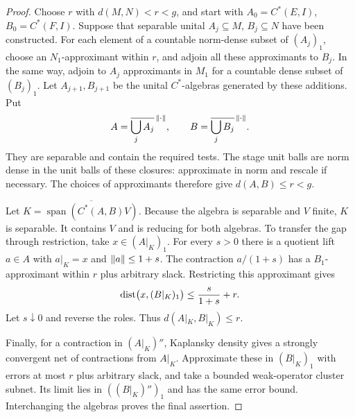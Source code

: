 \begin{proof}
Choose $r$ with $d(M,N)<r<g$, and start with
$A_0=C^*(E,I)$, $B_0=C^*(F,I)$.  Suppose that separable unital
$A_j\subseteq M$, $B_j\subseteq N$ have been constructed.  For
each element of a countable norm-dense subset of $(A_j)_1$, choose
an $N_1$-approximant within $r$, and adjoin all these approximants
to $B_j$.  In the same way, adjoin to $A_j$ approximants in $M_1$
for a countable dense subset of $(B_j)_1$.  Let $A_{j+1},B_{j+1}$
be the unital $C^*$-algebras generated by these additions.  Put
\[
 A=\overline{\bigcup_j A_j}^{\,\lVert\cdot\rVert},
 \qquad B=\overline{\bigcup_j B_j}^{\,\lVert\cdot\rVert}.
\]
They are separable and contain the required tests.  The stage unit
balls are norm dense in the unit balls of these closures: approximate
in norm and rescale if necessary.  The choices of approximants
therefore give $d(A,B)\leq r<g$.

Let $K=\overline{\operatorname{span}(C^*(A,B)V)}$.
Because the algebra is separable and
$V$ finite, $K$ is separable.  It contains $V$ and is reducing for
both algebras.  To transfer the gap through restriction, take
$x\in(A|_K)_1$.  For every $s>0$ there is a quotient lift
$a\in A$ with $a|_K=x$ and $\lVert a\rVert\leq1+s$.  The contraction
$a/(1+s)$ has a $B_1$-approximant within $r$ plus arbitrary slack.
Restricting this approximant gives
\[
 \operatorname{dist}\bigl(x,(B|_K)_1\bigr)
 \leq \frac{s}{1+s}+r.
\]
Let $s\downarrow0$ and reverse the roles.  Thus
$d(A|_K,B|_K)\leq r$.

Finally, for a contraction in $(A|_K)''$, Kaplansky density gives
a strongly convergent net of contractions from $A|_K$.  Approximate
these in $(B|_K)_1$ with errors at most $r$ plus arbitrary slack,
and take a bounded weak-operator cluster subnet.  Its limit lies in
$((B|_K)'')_1$ and has the same error bound.  Interchanging the
algebras proves the final assertion.
\end{proof}

